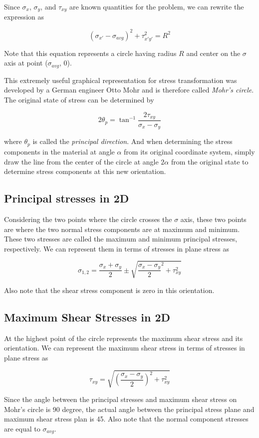 \documentclass[a4paper,openany,12pt]{book}
\begin{document}
Since \(\sigma_x\), \(\sigma_y\), and \(\tau_{xy}\) are known quantities for
the problem, we can rewrite the expression as

$$(\sigma_{x'} - \sigma_{avg})^2 + \tau_{x'y'}^2 = R^2$$

Note that this equation represents a circle having radius \(R\) and center
on the \(\sigma\) axis at point (\(\sigma_{avg}\), 0).


This extremely useful graphical representation for stress transformation
was developed by a German engineer Otto Mohr and is therefore called
\emph{Mohr's circle}. The original state of stress can be determined by

$$2\theta_p = \tan ^{-1}\frac{2\tau_{xy}}{\sigma_x - \sigma_y}$$

where \(\theta _p\) is called the \emph{principal direction}. And when
determining the stress components in the material at angle \(\alpha\) from
its original coordinate system, simply draw the line from the center of
the circle at angle \(2\alpha\) from the original state to determine
stress components at this new orientation.

\subsection{Principal stresses in 2D}
\label{sec:org4ef874a}
Considering the two points where the circle crosses the \(\sigma\) axis,
these two points are where the two normal stress components are at
maximum and minimum. These two stresses are called the maximum and
minimum principal stresses, respectively. We can represent them in terms
of stresses in plane stress as

$$\sigma_{1,2} = \frac{\sigma_x + \sigma_y}{2} \pm \sqrt {\frac{\sigma_x - \sigma_y}{2}^2 + \tau_{xy}^2}$$

Also note that the shear stress component is zero in this orientation.

\subsection{Maximum Shear Stresses in 2D}
\label{sec:orgfc3d1dd}
At the highest point of the circle represents the maximum shear stress
and its orientation. We can represent the maximum shear stress in terms
of stresses in plane stress as

$$ \tau_{xy} = \sqrt {\left( \frac{\sigma_x - \sigma_y}{2} \right)^2 + \tau_{xy}^2}$$

Since the angle between the principal stresses and maximum shear stress
on Mohr's circle is 90 degree, the actual angle between the principal
stress plane and maximum shear stress plan is 45. Also note that the
normal component stresses are equal to \(\sigma_{avg}\).
\end{document}
